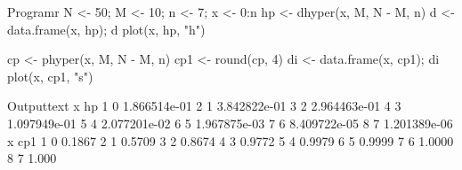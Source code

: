 \begin{code}
    {Program}{r}
N <- 50; M <- 10; n <- 7; x <- 0:n
hp <- dhyper(x, M, N - M, n)
d <- data.frame(x, hp); d
plot(x, hp, "h")

cp <- phyper(x, M, N - M, n)
cp1 <- round(cp, 4)
di <- data.frame(x, cp1); di
plot(x, cp1, "s")
\end{code}
\begin{code}
    {Output}{text}
  x           hp
1 0 1.866514e-01
2 1 3.842822e-01
3 2 2.964463e-01
4 3 1.097949e-01
5 4 2.077201e-02
6 5 1.967875e-03
7 6 8.409722e-05
8 7 1.201389e-06
  x    cp1
1 0 0.1867
2 1 0.5709
3 2 0.8674
4 3 0.9772
5 4 0.9979
6 5 0.9999
7 6 1.0000
8 7 1.000
\end{code}
\newpage


